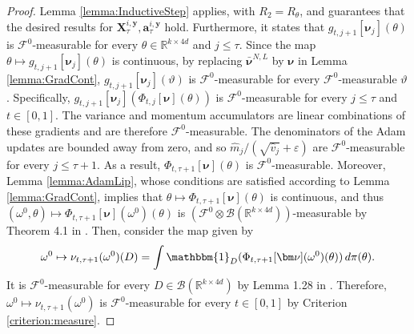 \documentclass{article}
\newcommand{\R}{\mathbb{R}}
\begin{document}
\begin{appendices}
\begin{proof}
Lemma \ref{lemma:InductiveStep} applies, with $R_2=R_\theta$, and guarantees that the desired results for $\bm X^{i,\bm{y}}_{\tau},\bm a^{i,\bm{y}}_{\tau}$ hold. Furthermore, it states that $g_{t,j+1}[\bm{\nu}_j](\theta)$ is $\mathcal F^0$-measurable for every $\theta \in \R^{k\times 4d}$ and $j\le \tau$. Since the map $\theta\mapsto g_{t,j+1}[\bm{\nu}_j](\theta)$ is continuous, by replacing $\bm{\bar\nu}^{N,L}$ by $\bm\nu$ in Lemma \ref{lemma:GradCont},  $g_{t,j+1}[\bm{\nu}_j](\vartheta)$ is $\mathcal F^0$-measurable for every $\mathcal F^0$-measurable $\vartheta$. Specifically, $g_{t,j+1}[\bm{\nu}_j](\Phi_{t,j}[\bm\nu](\theta))$ is $\mathcal F^0$-measurable for every $j\le \tau$ and $t\in[0,1]$. The variance and momentum accumulators are linear combinations of these gradients and are therefore $\mathcal F^0$-measurable. The denominators of the Adam updates are bounded away from zero, and so  $\hat m_j/(\sqrt{\hat v_j}+\varepsilon)$ are $\mathcal F^0$-measurable for every $j\le\tau+1$. As a result, $\Phi_{t,\tau+1}[\bm\nu](\theta)$ is $\mathcal F^0$-measurable. Moreover, Lemma \ref{lemma:AdamLip}, whose conditions are satisfied according to Lemma \ref{lemma:GradCont}, implies that $\theta\mapsto\Phi_{t,\tau+1}[\bm\nu](\theta)$ is continuous, and thus $(\omega^0,\theta)\mapsto \Phi_{t,\tau+1}[\bm\nu](\omega^0)(\theta)$ is $(\mathcal F^0\otimes \mathcal B(\R^{k\times 4d}))$-measurable by Theorem 4.1 in \cite{AZHMYAKOV201987}. Then, consider the map given by
\[
\omega^0\mapsto \nu_{t,\tau+1}(\omega^0)(D) = \int \mathbbm{1}_{D}(\Phi_{t,\tau+1}[\bm\nu](\omega^0)(\theta))\,d\pi(\theta).
\]
It is $\mathcal F^0$-measurable for every $D \in \mathcal B(\R^{k\times 4d})$ by Lemma 1.28 in \cite{Kallenberg2021}. Therefore, $\omega^0\mapsto \nu_{t,\tau+1}(\omega^0)$ is $\mathcal F^0$-measurable for every $t\in[0,1]$ by Criterion \ref{criterion:measure}.


\end{proof}
\end{appendices}
\end{document}
